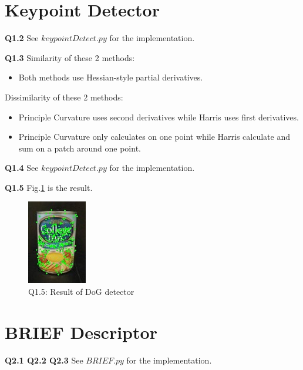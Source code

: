 \documentclass[
  course = {{16-720B Computer Vision}},
  quartile = {{1}},
  assignment = 4\ -\ Feature\ Descriptors\ \&\ Homographies\ \& \  RANSAC,
  name = {{Kangle Deng}},
  email = {{kangled@andrew.cmu.edu}},
  firstexercise = 1
]{aga-homework}
\begin{document}
\section{Keypoint Detector}

\noindent \textbf{Q1.2} See $keypointDetect.py$ for the implementation.

\noindent \textbf{Q1.3} Similarity of these 2 methods:

\begin{itemize}
    \item Both methods use Hessian-style partial derivatives.
\end{itemize}

Dissimilarity of these 2 methods:

\begin{itemize}
    \item Principle Curvature uses second derivatives while Harris uses first derivatives.
    \item Principle Curvature only calculates on one point while Harris calculate and sum on a patch around one point.
\end{itemize}

\noindent \textbf{Q1.4} See $keypointDetect.py$ for the implementation.

\noindent \textbf{Q1.5} Fig.\ref{fig:cv_hw4_q15} is the result.

\begin{figure}
    \centering
    \includegraphics{CV/fig/hw4/1_5.jpg}
    \caption{Q1.5: Result of DoG detector}
    \label{fig:cv_hw4_q15}
\end{figure}

\section{BRIEF Descriptor}

\noindent \textbf{Q2.1 Q2.2 Q2.3} See $BRIEF.py$ for the implementation.


\end{document}

